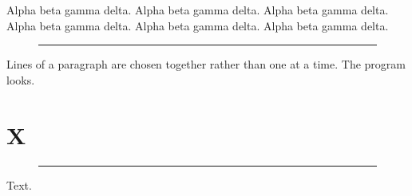 \documentclass{article}
\begin{document}
Alpha beta gamma delta. Alpha beta gamma delta. Alpha beta gamma delta. Alpha beta gamma delta. Alpha beta gamma delta. Alpha beta gamma delta.

\begin{figure}[h]
\rule{4cm}{1cm}
\end{figure}

Lines of a paragraph are chosen together rather than one at a time. The program looks.
\section{X}
\begin{figure}[h]
\rule{4cm}{1cm}
\end{figure}
Text.
\end{document}
